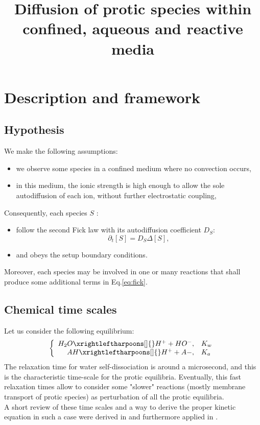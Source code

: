 \documentclass[aps,11pt]{revtex4}
\begin{document}
\title{Diffusion of protic species within confined, aqueous and reactive media}
\maketitle
	
\section{Description and framework}	

\subsection{Hypothesis}
 
We make the following assumptions:
\begin{itemize}
\item we observe some species in a confined medium where no convection occurs,
\item in this medium, the ionic strength is high enough to allow the sole autodiffusion of each ion, without further electrostatic coupling,
\end{itemize}


Consequently, each species $S$ :
\begin{itemize}
\item follow the second Fick law with its autodiffusion coefficient $D_S$:
\begin{equation}
\label{eq:fick}
	\partial_t [S] = D_S \Delta [S],
\end{equation}

\item and obeys the setup boundary conditions.
\end{itemize}

Moreover, each species may be involved in one or many reactions that shall produce some additional terms in Eq.\eqref{eq:fick}.

\subsection{Chemical time scales}

Let us consider the following equilibrium:
\begin{equation}
\label{eqs}
\left\lbrace
\begin{array}{rl}
H_2O \xrightleftharpoons[]{} H^+ + HO^-, &K_w \\
AH  \xrightleftharpoons[]{} H^+ + A-, & K_a\\
\end{array}
\right.
\end{equation}
The relaxation time for water self-dissociation is around a microsecond, and this is the characteristic time-scale
for the protic equilibria. Eventually, this fast relaxation times allow to consider some "slower" reactions (mostly membrane transport of protic species) as perturbation of all the protic equilibria.\\
A short review of these time scales and a way to derive the proper kinetic equation in such a case were derived in \cite{PLOS} and furthermore applied in \cite{BBA}.\\
\end{document}
